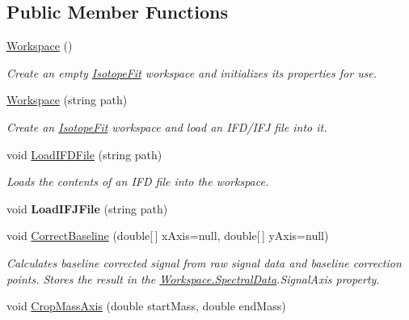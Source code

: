 \subsection*{Public Member Functions}
\begin{DoxyCompactItemize}
\item 
\hyperlink{class_isotope_fit_1_1_workspace_affa8b6ac937cee367c225c606782da17}{Workspace} ()
\begin{DoxyCompactList}\small\item\em Create an empty \hyperlink{namespace_isotope_fit}{Isotope\+Fit} workspace and initializes its properties for use. \end{DoxyCompactList}\item 
\hyperlink{class_isotope_fit_1_1_workspace_a5aa1f6546513d331f262d383fe6b0358}{Workspace} (string path)
\begin{DoxyCompactList}\small\item\em Create an \hyperlink{namespace_isotope_fit}{Isotope\+Fit} workspace and load an I\+F\+D/\+I\+FJ file into it. \end{DoxyCompactList}\item 
void \hyperlink{class_isotope_fit_1_1_workspace_a55061c1f05d3e02d2d591fe6211d2f1f}{Load\+I\+F\+D\+File} (string path)
\begin{DoxyCompactList}\small\item\em Loads the contents of an I\+FD file into the workspace. \end{DoxyCompactList}\item 
\mbox{\label{class_isotope_fit_1_1_workspace_aba9a547d376319e836898f4878ce7aab}} 
void {\bfseries Load\+I\+F\+J\+File} (string path)
\item 
void \hyperlink{class_isotope_fit_1_1_workspace_aa0b81213937d49ae3a6183563cfe0f60}{Correct\+Baseline} (double\mbox{[}$\,$\mbox{]} x\+Axis=null, double\mbox{[}$\,$\mbox{]} y\+Axis=null)
\begin{DoxyCompactList}\small\item\em Calculates baseline corrected signal from raw signal data and baseline correction points. Stores the result in the \hyperlink{class_isotope_fit_1_1_workspace_a1d6cc2dd07cbfe920da9f1bffc9b32c2}{Workspace.\+Spectral\+Data}.Signal\+Axis property. \end{DoxyCompactList}\item 
void \hyperlink{class_isotope_fit_1_1_workspace_a9c1e21aff90947ff3414ac9d90472452}{Crop\+Mass\+Axis} (double start\+Mass, double end\+Mass)

\end{DoxyCompactItemize}
